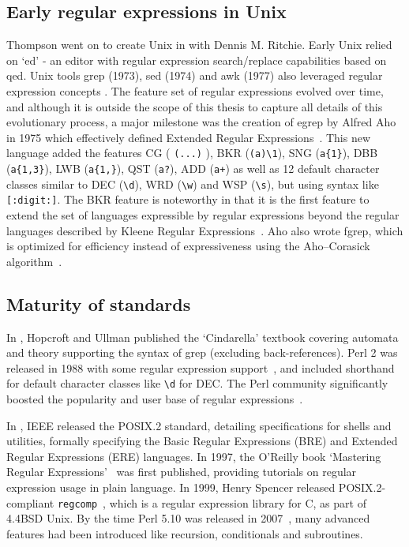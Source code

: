 \subsection{Early regular expressions in Unix}
Thompson went on to create Unix in \citeyear{Ritchie:1974:UTS:361011.361061} with Dennis M. Ritchie.  Early Unix relied on `ed' - an editor with regular expression search/replace capabilities based on qed.  Unix tools grep (1973), sed (1974) and awk (1977) also leveraged regular expression concepts \citep{UnixReader1987}.  The feature set of regular expressions evolved over time, and although it is outside the scope of this thesis to capture all details of this evolutionary process, a major milestone was the creation of egrep by Alfred Aho in 1975 which effectively defined Extended Regular Expressions~\citep{Hume:1988:TTG:55329.55333}.  This new language added the features CG ( \verb!(...)! ), BKR (\verb!(a)\1!), SNG (\verb!a{1}!), DBB (\verb!a{1,3}!), LWB (\verb!a{1,}!), QST (\verb!a?!), ADD (\verb!a+!) as well as 12 default character classes similar to DEC (\verb!\d!), WRD (\verb!\w!) and WSP (\verb!\s!), but using syntax like \verb![:digit:]!.  The BKR feature is noteworthy in that it is the first feature to extend the set of languages expressible by regular expressions beyond the regular languages described by Kleene Regular Expressions~\citep{Hopcroft:2006:IAT:1196416}. Aho also wrote fgrep, which is optimized for efficiency instead of expressiveness using the Aho–Corasick algorithm~\citep{Aho:1975:ESM:360825.360855}.

\subsection{Maturity of standards}
In \citeyear{HopcroftUllman1979}, Hopcroft and Ullman published the `Cindarella' textbook covering automata and theory supporting the syntax of grep (excluding back-references).  Perl 2 was released in 1988 with some regular expression support~\citep{perlhist}, and included shorthand for default character classes like \verb!\d! for DEC.  The Perl community significantly boosted the popularity and user base of regular expressions~\citep{perlTimeline}.

In \citeyear{IEEE1994POSIX2}, IEEE released the POSIX.2 standard, detailing specifications for shells and utilities, formally specifying the Basic Regular Expressions (BRE) and Extended Regular Expressions (ERE) languages.  In 1997, the O'Reilly book `Mastering Regular Expressions'~\citep{Friedl:2006:MRE:1209014} was first published, providing tutorials on regular expression usage in plain language.  In 1999, Henry Spencer released POSIX.2-compliant {\tt regcomp}~\citep{spencerTimeline}, which is a regular expression library for C, as part of 4.4BSD Unix.  By the time Perl 5.10 was released in 2007~\citep{perl5.10Release}, many advanced features had been introduced like recursion, conditionals and subroutines.
